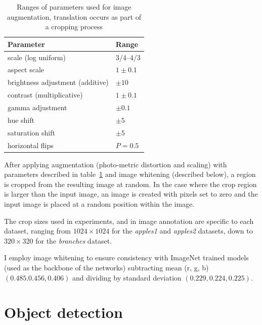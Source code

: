 \begin{table}[h]
  \centering
    \caption{Ranges of parameters used for image augmentation, translation occurs as part of a cropping process}
    
  \begin{tabular}{ l  l }
    Parameter & Range \\
    \toprule
    scale (log uniform) & ${3/4}$--${4/3}$  \\ 
    aspect scale  & $ 1 \pm 0.1 $  \\ 

    brightness adjustment (additive) & $ \pm 10 $ \\ 
    contrast (multiplicative) & $ 1 \pm 0.1 $ \\ 

    gamma adjustment & $ \pm 0.1 $ \\ 

    hue shift & $ \pm 5 $ \\ 
    saturation shift & $ \pm 5 $ \\ 
    
    horizontal flips & $ P = 0.5 $ \\ 
    
    \bottomrule
  \end{tabular}
\label{tab:obj_augmentation}
\end{table}

After applying augmentation (photo-metric distortion and scaling) with parameters described in table~\ref{tab:obj_augmentation} and image whitening (described below), a region is cropped from the resulting image at random. In the case where the crop region is larger than the input image, an image is created with pixels set to zero and the input image is placed at a random position within the image.

The crop sizes used in experiments, and in image annotation are specific to each dataset, ranging from $1024\times1024$ for the \emph{apples1} and \emph{apples2} datasets, down to $320\times320$ for the \emph{branches} dataset.

I employ image whitening to ensure consistency with ImageNet trained models (used as the backbone of the networks) subtracting mean (r, g, b) $ (0.485. 0.456, 0.406) $ and dividing by standard deviation $ (0.229, 0.224, 0.225) $.


\section {Object detection}

